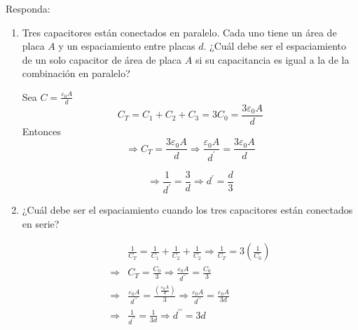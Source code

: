 \begin{problema}
    Responda: 
    \begin{enumerate}
        \item Tres capacitores están conectados en paralelo. Cada uno tiene un área de placa $A$ y un espaciamiento entre placas $d$. ¿Cuál debe ser el espaciamiento de un solo capacitor de área de placa $A$ si su capacitancia es igual a la de la combinación en paralelo? 
        \begin{sol}
            Sea $C=\frac{\varepsilon_{0} A}{d}$
            $$ C_{T}=C_{1}+C_{2}+C_{3}=3 C_{0}=\frac{3 \varepsilon_{0} A}{d}$$
Entonces 
$$\Rightarrow C_{T}=\frac{3 \varepsilon_{0} A}{d} \Rightarrow \frac{\varepsilon_{0} A}{d^{\prime}}=\frac{3 \varepsilon_{0} A}{d}$$


$$\Rightarrow \frac{1}{d^{\prime}}=\frac{3}{d} \Rightarrow d^{\prime}=\frac{d}{3}$$
        \end{sol}
        \item ¿Cuál debe ser el espaciamiento cuando los tres capacitores están conectados en serie?
        \begin{sol}
            $$
\begin{aligned}
& \frac{1}{C_{T}}=\frac{1}{C_{1}}+\frac{1}{C_{2}}+\frac{1}{C_{2}} \Rightarrow \frac{1}{C_{T}}=3\left(\frac{1}{C_{0}}\right) \\
\Rightarrow & C_{T}=\frac{C_{0}}{3} \Rightarrow \frac{\varepsilon_{0} A}{d^{\prime \prime}}=\frac{C_{0}}{3} \\
\Rightarrow & \frac{\varepsilon_{0} A}{d^{\prime \prime}}=\frac{\left(\frac{\varepsilon_{0} A}{d}\right)}{3} \Rightarrow \frac{\varepsilon_{0} A}{d^{\prime \prime}}=\frac{\varepsilon_{0} A}{3 d} \\
\Rightarrow & \frac{1}{d^{\prime \prime}}=\frac{1}{3 d} \Rightarrow d^{\prime \prime}=3 d
\end{aligned}
$$
        \end{sol}
    \end{enumerate}


\end{problema}

